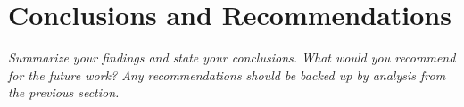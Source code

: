 \section{Conclusions and Recommendations}
\textit{Summarize your findings and state your conclusions. What would you recommend for the future work? Any recommendations should be backed up by analysis from the previous section.}
